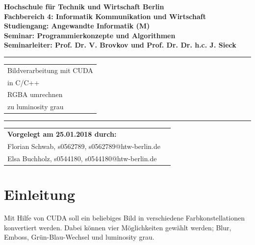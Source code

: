 \documentclass{llncs}
\begin{document}
	\lstset{language=c++, breaklines=true, frame=single}
\thispagestyle{empty}
\begin{flushleft}
\bfseries	Hochschule für Technik und Wirtschaft Berlin\\
	Fachbereich 4: Informatik Kommunikation und Wirtschaft \\
	Studiengang: Angewandte Informatik (M)\\
	Seminar: Programmierkonzepte und Algorithmen\\
	Seminarleiter: Prof. Dr. V. Brovkov und Prof. Dr. Dr. h.c. J. Sieck\\ [2.5cm]
\end{flushleft}
\vspace{45pt}
\rule{\textwidth}{1pt}
\vspace{2pt}
\begin{flushright}
\Huge
\begin{tabular}{@{}l}
Bildverarbeitung mit CUDA\\ in C/C++\\
RGBA umrechnen\\ zu luminosity grau\\[6pt]

\end{tabular}
\end{flushright}
\rule{\textwidth}{1pt}
\vfill

\begin{flushleft}
\begin{tabular}{ll}
{\bfseries Vorgelegt am 25.01.2018 durch: }\\
Florian Schwab, s0562789, s0562789@htw-berlin.de \\
Elsa Buchholz, s0544180, s0544180@htw-berlin.de \\
\end{tabular}
\end{flushleft}

%
\newpage
\tableofcontents
\newpage
%
\section{Einleitung}
%
Mit Hilfe von CUDA soll ein beliebiges Bild in verschiedene Farbkonstellationen konvertiert werden. Dabei können vier  Möglichkeiten gewählt werden; Blur, Emboss, Grün-Blau-Wechsel und luminosity grau.\\
\end{document}
